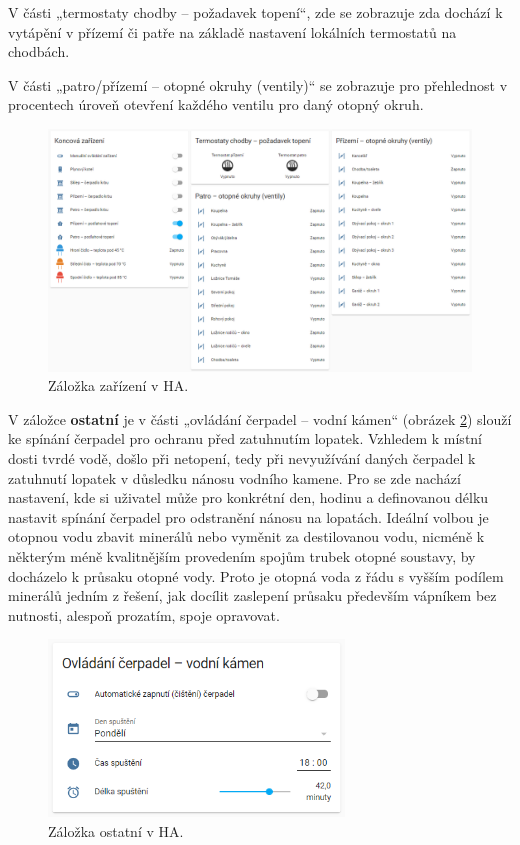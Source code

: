 V části „termostaty chodby – požadavek topení“, zde se zobrazuje zda dochází k vytápění v přízemí či patře na základě nastavení lokálních termostatů na chodbách.

V části „patro/přízemí – otopné okruhy (ventily)“ se zobrazuje pro přehlednost v procentech úroveň otevření každého ventilu pro daný otopný okruh.

\begin{figure}[H]
    \centering
    \includegraphics[width=\textwidth]{images/software-ha/zalozka-zarizeni.png}
    \caption{Záložka zařízení v HA.}
    \label{fig:zalozka-zarizeni}
\end{figure}

V záložce \textbf{ostatní} je v části „ovládání čerpadel – vodní kámen“ (obrázek \ref{fig:zalozka-ostatni}) slouží ke spínání čerpadel pro ochranu před zatuhnutím lopatek. Vzhledem k místní dosti tvrdé vodě, došlo při netopení, tedy při nevyužívání daných čerpadel k zatuhnutí lopatek v důsledku nánosu vodního kamene. Pro se zde nachází nastavení, kde si uživatel může pro konkrétní den, hodinu a definovanou délku nastavit spínání čerpadel pro odstranění nánosu na lopatách. Ideální volbou je otopnou vodu zbavit minerálů nebo vyměnit za destilovanou vodu, nicméně k některým méně kvalitnějším provedením spojům trubek otopné soustavy, by docházelo k průsaku otopné vody. Proto je otopná voda z řádu s vyšším podílem minerálů jedním z řešení, jak docílit zaslepení průsaku především vápníkem bez nutnosti, alespoň prozatím, spoje opravovat.

\begin{figure}[H]
    \centering
    \includegraphics[width=0.7\textwidth]{images/software-ha/zalozka-ostatni.png}
    \caption{Záložka ostatní v HA.}
    \label{fig:zalozka-ostatni}
\end{figure}


